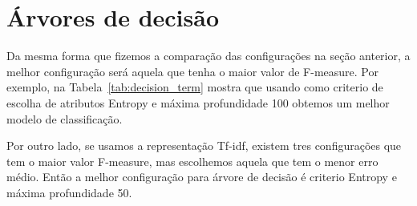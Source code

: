 \section{Árvores de decisão}
\label{sec:decision}

Da mesma forma que fizemos a comparação das configurações na seção anterior, a melhor configuração será aquela que tenha o maior valor de F-measure. Por exemplo, na Tabela~\ref{tab:decision_term} mostra que usando como criterio de escolha de atributos Entropy e máxima profundidade 100 obtemos um melhor modelo de classificação.



Por outro lado, se usamos a representação Tf-idf, existem tres configurações que tem o maior valor F-measure, mas escolhemos aquela que tem o menor erro médio. Então a melhor configuração para árvore de decisão é criterio Entropy e máxima profundidade 50.

